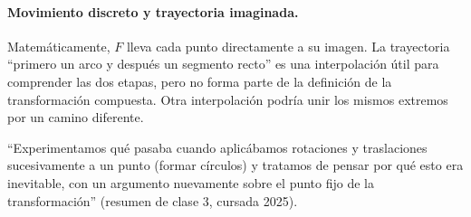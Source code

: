 \paragraph{Movimiento discreto y trayectoria imaginada.}
Matemáticamente, \(F\) lleva cada punto directamente a su imagen. La trayectoria ``primero
un arco y después un segmento recto'' es una interpolación útil para comprender las dos
etapas, pero no forma parte de la definición de la transformación compuesta. Otra
interpolación podría unir los mismos extremos por un camino diferente.

\begin{idea}
``Experimentamos qué pasaba cuando aplicábamos rotaciones y traslaciones sucesivamente a
un punto (formar círculos) y tratamos de pensar por qué esto era inevitable, con un
argumento nuevamente sobre el punto fijo de la transformación'' (resumen de clase 3, cursada 2025).
\end{idea}

